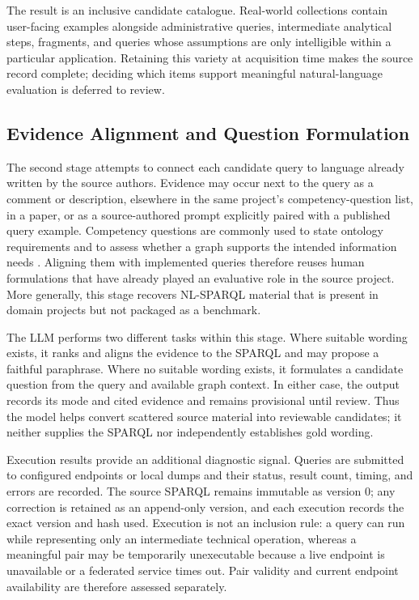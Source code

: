 The result is an inclusive candidate catalogue. Real-world collections contain user-facing examples alongside administrative queries, intermediate analytical steps, fragments, and queries whose assumptions are only intelligible within a particular application. Retaining this variety at acquisition time makes the source record complete; deciding which items support meaningful natural-language evaluation is deferred to review.

\subsection{Evidence Alignment and Question Formulation}\label{evidence-alignment-and-question-formulation}

The second stage attempts to connect each candidate query to language already written by the source authors. Evidence may occur next to the query as a comment or description, elsewhere in the same project's competency-question list, in a paper, or as a source-authored prompt explicitly paired with a published query example. Competency questions are commonly used to state ontology requirements and to assess whether a graph supports the intended information needs \citep{gruninger1995competency}. Aligning them with implemented queries therefore reuses human formulations that have already played an evaluative role in the source project. More generally, this stage recovers NL-SPARQL material that is present in domain projects but not packaged as a benchmark.

The LLM performs two different tasks within this stage. Where suitable wording exists, it ranks and aligns the evidence to the SPARQL and may propose a faithful paraphrase. Where no suitable wording exists, it formulates a candidate question from the query and available graph context. In either case, the output records its mode and cited evidence and remains provisional until review. Thus the model helps convert scattered source material into reviewable candidates; it neither supplies the SPARQL nor independently establishes gold wording.

Execution results provide an additional diagnostic signal. Queries are submitted to configured endpoints or local dumps and their status, result count, timing, and errors are recorded. The source SPARQL remains immutable as version 0; any correction is retained as an append-only version, and each execution records the exact version and hash used. Execution is not an inclusion rule: a query can run while representing only an intermediate technical operation, whereas a meaningful pair may be temporarily unexecutable because a live endpoint is unavailable or a federated service times out. Pair validity and current endpoint availability are therefore assessed separately.

